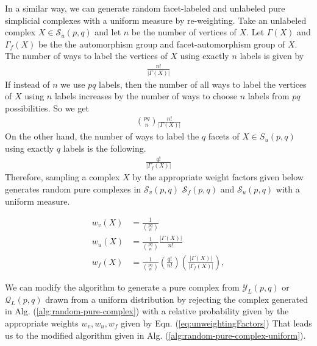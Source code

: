 \documentclass[12pt]{article}
\theoremstyle{plain}
\theoremstyle{definition}
\theoremstyle{remark}
\begin{document}
In a similar way, we can generate random facet-labeled and unlabeled pure simplicial complexes with a uniform measure by re-weighting. Take an unlabeled complex $X \in \mathcal{S}_u(p,q)$ and let $n$ be the number of vertices of $X$. Let $\Gamma(X)$  and $\Gamma_f(X)$ be the the automorphism group and facet-automorphism group of $X$. The number of ways to label the vertices of $X$ using exactly $n$ labels is given by 
\begin{align}  \label{eq:numVertexLabelsN}
    \frac{n!}{|\Gamma(X)|}
\end{align}
If instead of $n$ we use $pq$  labels, then the number of all ways to label the vertices of $X$ using $n$ labels increases by the number of ways to choose $n$ labels from $pq$ possibilities. So we get  
\begin{align}
    \label{eq:numVertexLabelsPQ}
    \binom{pq}{n}\frac{n!}{|\Gamma(X)|}
\end{align}
On the other hand, the number of ways to label the $q$ facets of $X \in S_u(p,q)$ using exactly $q$ labels is the following. 
\begin{align}
\label{eq:eq:numFacetLabels}
    \frac{q!}{|\Gamma_f(X)|}
\end{align}
Therefore, sampling a complex $X$ by the appropriate weight factors given below generates random pure complexes in $\mathcal{S}_v(p,q)$ $\mathcal{S}_f(p,q)$ and $\mathcal{S}_u(p,q)$ with a uniform measure. 

\begin{align}
\label{eq:unweightingFactors}
    w_v(X)&=\frac{1}{\binom{pq}{n}}\\
    w_u(X)&=\frac{1}{\binom{pq}{n}}\frac{|\Gamma(X)|}{n!}\\
    w_f(X)&=\frac{1}{\binom{pq}{n}}\left(\frac{q!}{n!}\right)\left(\frac{|\Gamma(X)|}{|\Gamma_f(X)|}\right),
\end{align} 

We can modify the algorithm to generate a pure complex from $\mathcal{Y}_L(p,q)$ or $\mathcal{Q}_L(p,q)$ drawn from a uniform distribution by rejecting the complex generated in Alg. (\ref{alg:random-pure-complex}) with a relative probability given by the appropriate weights $w_v, w_u, w_f$  given by Eqn. (\ref{eq:unweightingFactors})
That leads us to the modified algorithm given in Alg. (\ref{alg:random-pure-complex-uniform}).
\end{document}
